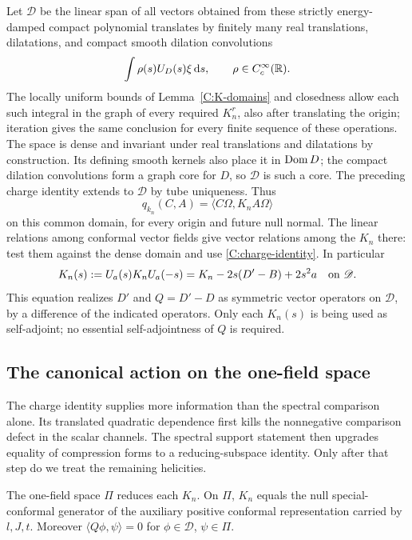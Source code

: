 Let $\mathscr D$ be the linear span of all vectors obtained from these
strictly energy-damped compact polynomial translates by finitely many
real translations, dilatations, and compact smooth dilation convolutions
\[
 \int \rho(s)U_D(s)\xi\,\mathrm d s,\qquad
 \rho\in C_c^\infty(\mathbb R).
\]
The locally uniform bounds of Lemma~\ref{C:K-domains} and closedness
allow each such integral in the graph of every required $K_n^r$, also
after translating the origin; iteration gives the same conclusion for
every finite sequence of these operations. The space is dense and
invariant under real translations and dilatations by construction.
Its defining smooth kernels also
place it in $\operatorname{Dom} D$; the compact dilation convolutions form a graph
core for $D$, so $\mathscr D$ is such a core.
The preceding charge identity extends to $\mathscr D$ by
tube uniqueness. Thus
\begin{equation}\label{C:charge-identity}
 q_{k_n}(C,A)=\langle C\Omega,K_nA\Omega\rangle
\end{equation}
on this common domain, for every origin and future null normal.
The linear relations among conformal vector fields give vector
relations among the $K_n$ there: test them against the dense
domain and use \eqref{C:charge-identity}. In particular
\begin{equation}\label{C:quadratic-charge-translation}
 K_n(s):=U_a(s)K_nU_a(-s)
       =K_n-2s(D'-B)+2s^2a\quad\hbox{on }\mathscr D.
\end{equation}
This equation realizes $D'$ and $Q=D'-D$ as symmetric vector
operators on $\mathscr D$, by a difference of the indicated
operators. Only each $K_n(s)$ is being used as self-adjoint;
no essential self-adjointness of $Q$ is required.

\subsection{The canonical action on the one-field space}

The charge identity supplies more information than the spectral
comparison alone.  Its translated quadratic dependence first kills
the nonnegative comparison defect in the scalar channels.  The
spectral support statement then upgrades equality of compression
forms to a reducing-subspace identity.  Only after that step do we
treat the remaining helicities.

\begin{theorem}\label{C:canonical-Pi}
The one-field space $\Pi$ reduces each $K_n$. On $\Pi$, $K_n$
equals the null special-conformal generator of the auxiliary
positive conformal representation carried by $l,J,t$.
Moreover $\langle Q\phi,\psi\rangle=0$ for
$\phi\in\mathscr D$, $\psi\in\Pi$.
\end{theorem}

